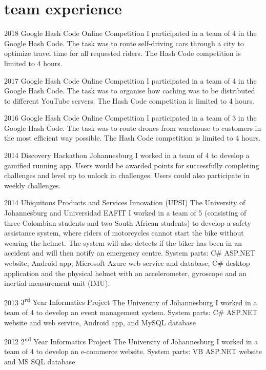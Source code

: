 \documentclass[]{friggeri-cv} %
\begin{document}

\section{team experience}

\begin{entrylist}

\entry
{2018}
{Google Hash Code}
{Online Competition}
{I participated in a team of 4 in the Google Hash Code. The task was to route self-driving cars through a city to optimize travel time for all requested riders. The Hash Code competition is limited to 4 hours.}

\entry
{2017}
{Google Hash Code}
{Online Competition}
{I participated in a team of 4 in the Google Hash Code. The task was to organise how caching was to be distributed to different YouTube servers. The Hash Code competition is limited to 4 hours.}

\entry
{2016}
{Google Hash Code}
{Online Competition}
{I participated in a team of 3 in the Google Hash Code. The task was to route drones from warehouse to customers in the most efficient way possible. The Hash Code competition is limited to 4 hours.}

\entry
{2014}
{Discovery Hackathon}
{Johannesburg}
{I worked in a team of 4 to develop a gamified running app. Users would be awarded points for successfully completing challenges and level up to unlock in challenges. Users could also participate in weekly challenges.}

\entry
{2014}
{Ubiquitous Products and Services Innovation (UPSI)}
{The University of Johannesburg and Universidad EAFIT}
{I worked in a team of 5 (consisting of three Colombian students and two South African students) to develop a safety assistance system, where riders of motorcycles cannot start the bike without wearing the helmet. The system will also detects if the biker has been in an accident and will then notify an emergency centre. System parts: C\# ASP.NET website, Android app, Microsoft Azure web service and database, C\# desktop application and the physical helmet with an accelerometer, gyroscope and an inertial measurement unit (IMU).}

\entry
{2013}
{3\textsuperscript{rd} Year Informatics Project}
{The University of Johannesburg}
{I worked in a team of 4 to develop an event management system. System parts: C\# ASP.NET website and web service, Android app, and MySQL database}

\entry
{2012}
{2\textsuperscript{nd} Year Informatics Project}
{The University of Johannesburg}
{I worked in a team of 4 to develop an e-commerce website. System parts: VB ASP.NET website and MS SQL database}

\end{entrylist}
\end{document}
